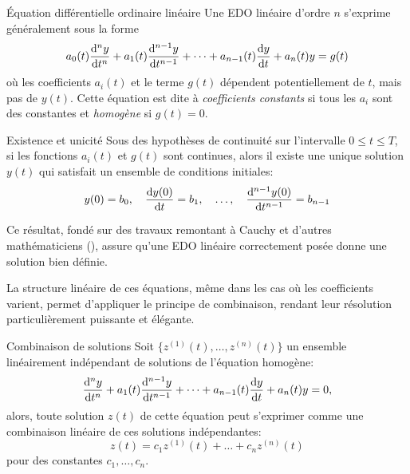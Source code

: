             \begin{definition}{Équation différentielle ordinaire linéaire}  
                Une EDO linéaire d'ordre $n$ s'exprime généralement sous la forme
                \begin{equation}
                a_0(t)\frac {\mathrm d^{n}{y}}{\mathrm d{t}^{n}} + a_1(t) \frac {\mathrm d^{n-1}{y}}{\mathrm d{t}^{n-1}} + \dots + a_{n-1}(t) \frac {\mathrm d{y}}{\mathrm d{t}} + a_n(t)y=g(t)
                \end{equation}
                où les coefficients $a_i(t)$ et le terme $g(t)$ dépendent potentiellement de $t$, mais pas de $y(t)$. Cette équation est dite à \emph{coefficients constants} si tous les $a_i$ sont des constantes et \emph{homogène} si $g(t)=0$.  
            \end{definition}
            
            \begin{theorem}{Existence et unicité}  
                Sous des hypothèses de continuité sur l'intervalle $0 \leq t \leq T$, si les fonctions $a_i(t)$ et $g(t)$ sont continues, alors il existe une unique solution $y(t)$ qui satisfait un ensemble de conditions initiales:
                \begin{equation}
                y(0)=b_0, \quad \frac {\mathrm d{y(0)}}{\mathrm d{t}}=b_1, \quad \dots, \quad \frac {\mathrm d^{n-1}{y(0)}}{\mathrm d{t}^{n-1}}=b_{n-1}
                \end{equation}
            \end{theorem}
            Ce résultat, fondé sur des travaux remontant à Cauchy et d'autres mathématiciens (\cite{Cauchy1840}), assure qu'une EDO linéaire correctement posée donne une solution bien définie.

            La structure linéaire de ces équations, même dans les cas où les coefficients varient, permet d'appliquer le principe de combinaison, rendant leur résolution particulièrement puissante et élégante.
            
            \begin{theorem}{Combinaison de solutions}  
                Soit $\{z^{(1)}(t), \dots, z^{(n)}(t)\}$ un ensemble linéairement indépendant de solutions de l'équation homogène:
                \begin{equation}
                \frac {\mathrm d^{n}{y}}{\mathrm d{t}^{n}} + a_1(t) \frac {\mathrm d^{n-1}{y}}{\mathrm d{t}^{n-1}} + \dots + a_{n-1}(t) \frac {\mathrm d{y}}{\mathrm d{t}} + a_n(t)y = 0,
                \end{equation}
                alors, toute solution $z(t)$ de cette équation peut s'exprimer comme une combinaison linéaire de ces solutions indépendantes:
                \begin{equation}
                z(t)=c_1 z^{(1)}(t) + \dots + c_n z^{(n)}(t)
                \end{equation}
                pour des constantes $c_1, \dots, c_n$.
            \end{theorem}
        
